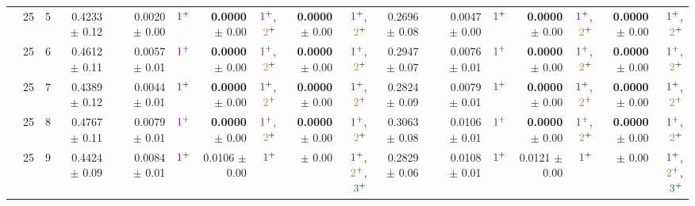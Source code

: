 \begin{table}
\begin{tiny}
\begin{tabular}[t]{rrrrrrrrrrrrrrrrrrr}
 & 25 & 5 & 0.4233 $\pm$ 0.12 &  & 0.0020 $\pm$ 0.00 & $\textcolor{violet}{1}^{+}$ & \textbf{0.0000} $\pm$ 0.00 & $\textcolor{violet}{1}^{+}$,$\textcolor{brown}{2}^{+}$ & \textbf{0.0000} $\pm$ 0.00 & $\textcolor{violet}{1}^{+}$,$\textcolor{brown}{2}^{+}$ & 0.2696 $\pm$ 0.08 &  & 0.0047 $\pm$ 0.00 & $\textcolor{violet}{1}^{+}$ & \textbf{0.0000} $\pm$ 0.00 & $\textcolor{violet}{1}^{+}$,$\textcolor{brown}{2}^{+}$ & \textbf{0.0000} $\pm$ 0.00 & $\textcolor{violet}{1}^{+}$,$\textcolor{brown}{2}^{+}$\\

 & 25 & 6 & 0.4612 $\pm$ 0.11 &  & 0.0057 $\pm$ 0.01 & $\textcolor{violet}{1}^{+}$ & \textbf{0.0000} $\pm$ 0.00 & $\textcolor{violet}{1}^{+}$,$\textcolor{brown}{2}^{+}$ & \textbf{0.0000} $\pm$ 0.00 & $\textcolor{violet}{1}^{+}$,$\textcolor{brown}{2}^{+}$ & 0.2947 $\pm$ 0.07 &  & 0.0076 $\pm$ 0.01 & $\textcolor{violet}{1}^{+}$ & \textbf{0.0000} $\pm$ 0.00 & $\textcolor{violet}{1}^{+}$,$\textcolor{brown}{2}^{+}$ & \textbf{0.0000} $\pm$ 0.00 & $\textcolor{violet}{1}^{+}$,$\textcolor{brown}{2}^{+}$\\

 & 25 & 7 & 0.4389 $\pm$ 0.12 &  & 0.0044 $\pm$ 0.01 & $\textcolor{violet}{1}^{+}$ & \textbf{0.0000} $\pm$ 0.00 & $\textcolor{violet}{1}^{+}$,$\textcolor{brown}{2}^{+}$ & \textbf{0.0000} $\pm$ 0.00 & $\textcolor{violet}{1}^{+}$,$\textcolor{brown}{2}^{+}$ & 0.2824 $\pm$ 0.09 &  & 0.0079 $\pm$ 0.01 & $\textcolor{violet}{1}^{+}$ & \textbf{0.0000} $\pm$ 0.00 & $\textcolor{violet}{1}^{+}$,$\textcolor{brown}{2}^{+}$ & \textbf{0.0000} $\pm$ 0.00 & $\textcolor{violet}{1}^{+}$,$\textcolor{brown}{2}^{+}$\\

 & 25 & 8 & 0.4767 $\pm$ 0.11 &  & 0.0079 $\pm$ 0.01 & $\textcolor{violet}{1}^{+}$ & \textbf{0.0000} $\pm$ 0.00 & $\textcolor{violet}{1}^{+}$,$\textcolor{brown}{2}^{+}$ & \textbf{0.0000} $\pm$ 0.00 & $\textcolor{violet}{1}^{+}$,$\textcolor{brown}{2}^{+}$ & 0.3063 $\pm$ 0.08 &  & 0.0106 $\pm$ 0.01 & $\textcolor{violet}{1}^{+}$ & \textbf{0.0000} $\pm$ 0.00 & $\textcolor{violet}{1}^{+}$,$\textcolor{brown}{2}^{+}$ & \textbf{0.0000} $\pm$ 0.00 & $\textcolor{violet}{1}^{+}$,$\textcolor{brown}{2}^{+}$\\

 & 25 & 9 & 0.4424 $\pm$ 0.09 &  & 0.0084 $\pm$ 0.01 & $\textcolor{violet}{1}^{+}$ & 0.0106 $\pm$ 0.00 & $\textcolor{violet}{1}^{+}$ & \cellcolor{gray!0}{\textbf{0.0000}} $\pm$ 0.00 & $\textcolor{violet}{1}^{+}$,$\textcolor{brown}{2}^{+}$,$\textcolor{teal}{3}^{+}$ & 0.2829 $\pm$ 0.06 &  & 0.0108 $\pm$ 0.01 & $\textcolor{violet}{1}^{+}$ & 0.0121 $\pm$ 0.00 & $\textcolor{violet}{1}^{+}$ & \cellcolor{gray!0}{\textbf{0.0000}} $\pm$ 0.00 & $\textcolor{violet}{1}^{+}$,$\textcolor{brown}{2}^{+}$,$\textcolor{teal}{3}^{+}$\\


\end{tabular}
\end{tiny}
\end{table}
